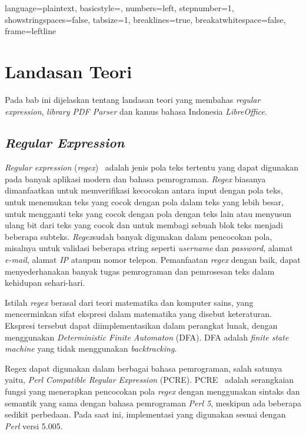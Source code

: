 
\lstset
{ 
    language=plaintext,
    basicstyle=\footnotesize,
    numbers=left,
    stepnumber=1,
    showstringspaces=false,
    tabsize=1,
    breaklines=true,
    breakatwhitespace=false,
    frame=leftline
}

\chapter{Landasan Teori}
\label{chap:teori}

Pada bab ini dijelaskan tentang landasan teori yang membahas \textit{regular expression}, \textit{library PDF Parser} dan kamus bahasa Indonesia \textit{LibreOffice}.

\section{\textit{Regular Expression}}
\label{sec:regex} 
 
\textit{Regular expression} (\textit{regex})~\cite{jan:12:cookbook} adalah jenis pola teks tertentu yang dapat digunakan pada banyak aplikasi modern dan bahasa pemrograman. \textit{Regex} biasanya dimanfaatkan untuk memverifikasi kecocokan antara input dengan pola teks, untuk menemukan teks yang cocok dengan pola dalam teks yang lebih besar, untuk mengganti teks yang cocok dengan pola dengan teks lain atau menyusun ulang bit dari teks yang cocok dan untuk membagi sebuah blok teks menjadi beberapa subteks. \textit{Regex}sudah banyak digunakan dalam pencocokan pola, misalnya untuk validasi beberapa string seperti \textit{username} dan \textit{password}, alamat \textit{e-mail}, alamat \textit{IP} ataupun nomor telepon. Pemanfaatan \textit{regex} dengan baik, dapat menyederhanakan banyak tugas pemrograman dan pemrosesan teks dalam kehidupan sehari-hari.

Istilah \textit{regex} berasal dari teori matematika dan komputer sains, yang mencerminkan sifat ekspresi dalam matematika yang disebut keteraturan. Ekspresi tersebut dapat diimplementasikan dalam perangkat lunak, dengan menggunakan \textit{Deterministic Finite Automaton} (DFA). DFA adalah \textit{finite state machine} yang tidak menggunakan \textit{backtracking}.

Regex dapat digunakan dalam berbagai bahasa pemrograman, salah satunya yaitu, \textit{Perl Compatible Regular Expression} (PCRE). PCRE~\cite{pcre} adalah serangkaian fungsi yang menerapkan pencocokan pola \textit{regex} dengan menggunakan sintaks dan semantik yang sama dengan bahasa pemrograman \textit{Perl 5}, meskipun ada beberapa sedikit perbedaan. Pada saat ini, implementasi yang digunakan sesuai dengan \textit{Perl} versi 5.005.

